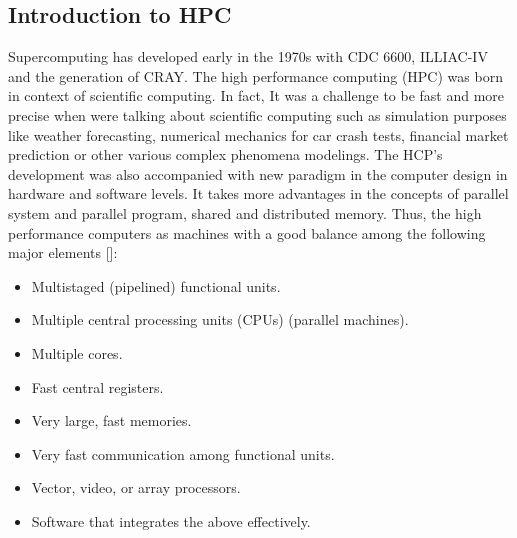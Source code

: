 \subsection{Introduction to HPC}
Supercomputing has developed early in the 1970s with CDC 6600, ILLIAC-IV and the generation of CRAY. The high performance computing (HPC) was born in context of scientific computing. In fact, It was a challenge to be fast and more precise when were talking about scientific computing such as simulation purposes like weather forecasting, numerical mechanics for car crash tests, financial market prediction or other various complex phenomena modelings. The HCP's development was also accompanied with new paradigm in the computer design in hardware and software levels. It takes more advantages in the concepts of parallel system and parallel program, shared and distributed memory. Thus, the high performance computers as
machines with a good balance among the following major elements []:
\begin{itemize}
\item Multistaged (pipelined) functional units.
\item Multiple central processing units (CPUs) (parallel machines).
\item Multiple cores. 
\item Fast central registers.
\item Very large, fast memories.
\item Very fast communication among functional units.
\item Vector, video, or array processors.
\item Software that integrates the above effectively.
\end{itemize}

